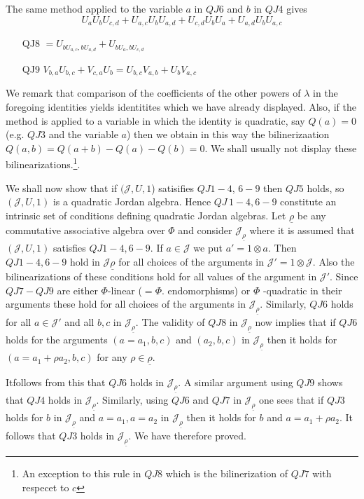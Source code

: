 The same method applied to the variable $a$ in $QJ6$ and $b$ in $QJ4$ gives
$$
U_a U_b U_{c,d}+U_{a,c} U_b U_{a,d}+U_{c,d}U_b U_a + U_{a,d} U_b U_{a,c}
$$
\begin{itemize}
\item[QJ8] $=U_{b U_{a,c},b U_{a,d}}+U_{bU_{a},b U_{c,d}}$

\item[QJ9] $V_{b,a} U_{b,c}+V_{c,a}U_b=U_{b,c}V_{a,b}+U_b V_{a,c}$
\end{itemize}\pageoriginale

We remark that comparison of the coefficients of the other powers of
$\lambda$ in the foregoing identities yields identitites which we have
already displayed. Also, if the method is applied to a variable in
which the identity is quadratic, say $Q(a)=0$ (e.g. $QJ3$ and the
variable $a$) then  we obtain in this way the bilinerizaation
$Q(a,b)=Q(a+b)-Q(a)-Q(b)=0$. We shall usually not display these
bilinearizations.\footnote{An exception to this rule in $QJ8$ which is
  the bilinerization of $QJ7$ with respecet to $c$}. 

We shall now show that if $(\mathscr{J},U,1$) satisifies $QJ1-4$,
$6-9$ then $QJ5$ holds, so $(\mathscr{J}, U, 1)$ is a quadratic Jordan
algebra. Hence $QJ\, 1-4, 6-9$ constitute an intrinsic set of conditions
defining quadratic Jordan algebras. Let $\underline{\rho}$ be any
commutative associative algebra over $\Phi$ and consider
$\mathscr{J}_{\underline{\rho}}$ where it is assumed that
$(\mathscr{J},U,1)$ satisfies $QJ1-4,6-9$. If $a\in \mathscr{J}$ we
put $a'=1\otimes a$. Then $QJ1-4, 6-9$ hold in
$\mathscr{J}\underline{\rho}$ for all choices of the arguments in
$\mathscr{J}'=1\otimes \mathscr{J}$. Also the bilinearizations of
these conditions hold for all values of the argument in
$\mathscr{J}'$. Since $QJ7-QJ9$ are either $\Phi$-linear
($=\Phi$. endomorphisms) or $\Phi$ -quadratic in their arguments these
hold for all choices of the arguments in
$\mathscr{J}_{\underline{\rho}}$. Similarly, $QJ6$ holds for all $a\in
\mathscr{J}'$ and all $b,c$ in $\mathscr{J}_{\underline{\rho}}$. The
validity of $QJ8$ in $\mathscr{J}_{\underline{\rho}}$ now implies that
if $QJ6$ holds for the arguments $(a=a_1, b, c)$ and $(a_2, b, c)$ in
$\mathscr{J}_{\underline{\rho}}$  then it holds for $(a=a_1+\rho
a_2,b,c)$ for any $\rho \in \underline{\rho}$. 

It\pageoriginale follows from this that $QJ6$ holds in
$\mathscr{J}_{\underline{\rho}}$. A similar argument using $QJ9$ shows
that $QJ4$ holds in $\mathscr{J}_{\underline{\rho}}$. Similarly, using
$QJ6$ and $QJ7$ in $\mathscr{J}_{\underline{\rho}}$ one sees that if
$QJ3$ holds for $b$ in $\mathscr{J}_{\underline{\rho}}$ and $a=a_1,a=a_2$
in $\mathscr{J}_{\underline{\rho}}$ then it holds for $b$ and $a=a_1+\rho
a_2$. It follows that $QJ3$ holds in $\mathscr{J}_{\underline{\rho}}$. We
have therefore proved. 


